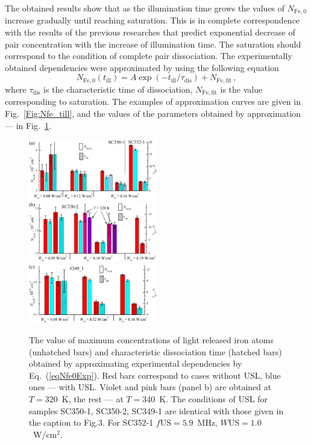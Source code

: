 \documentclass[%
 aip,jap,
 amsmath,amssymb,
 reprint,%
]{revtex4-1}
\begin{document}
The obtained results show that as the illumination time grows 
the values of $N_\mathrm{Fe,0}$ increase gradually until reaching saturation. 
This is in complete correspondence with the results of the previous researches \cite{FeBLight2,FeBAssJAP2014,FeBKin2019} 
that predict exponential decrease of pair concentration with the increase of illumination time. 
The saturation should correspond to the condition of complete pair dissociation. 
The experimentally obtained dependencies were approximated by using the following equation
\begin{equation}
\label{eqNfe0Exp}
N_\mathrm{Fe,0}(t_\mathrm{ill})=A\exp(-t_\mathrm{ill}/\tau_\mathrm{dis})
+N_\mathrm{Fe,fit}\,,
\end{equation}
where 
$\tau_\mathrm{dis}$ is the characteristic time of dissociation, 
$N_\mathrm{Fe,fit}$ is the value corresponding to saturation. 
The examples of approximation curves are given in Fig.~\ref{Fig:Nfe_till}, 
and the values of the parameters obtained by approximation --- in Fig.~\ref{Fig:IllRez}.

\begin{figure}
\includegraphics[width=0.5\textwidth]{Fig5a}\\%
\includegraphics[width=0.5\textwidth]{Fig5b}\\%
\includegraphics[width=0.5\textwidth]{Fig5c}%
\caption{\label{Fig:IllRez}
The value of maximum concentrations of light released iron atoms (unhatched bars) 
and characteristic dissociation time (hatched bars) obtained by approximating experimental dependencies by Eq.~(\ref{eqNfe0Exp}). 
Red bars correspond to cases without USL, 
blue ones --- with USL. 
Violet and pink bars (panel b) are obtained at $T=320$~K, 
the rest --- at $T=340$~K. 
The conditions of USL for samples SC350-1, SC350-2, 
SC349-1 are identical with those given in the caption to Fig.3. 
For SC352-1 $f\mathrm{US}=5.9$~MHz, 
$W\mathrm{US}=1.0$~W/cm$^2$.
}
\end{figure}
\end{document}
